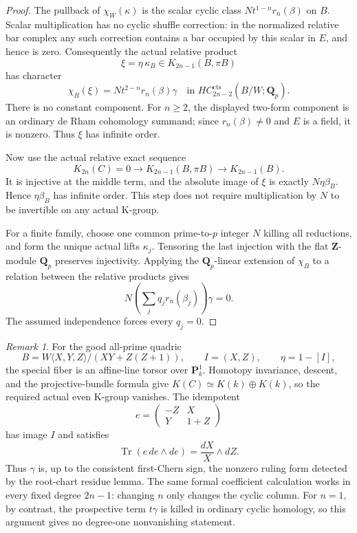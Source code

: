 \documentclass[11pt,a4paper]{article}
\theoremstyle{remark}
\newtheorem{remark}[theorem]{Remark}
\begin{document}
\begin{proof}
The pullback of $\chi_W(\kappa)$ is the scalar cyclic class
$Nt^{1-n}r_n(\beta)$ on $B$. Scalar multiplication has no cyclic
shuffle correction: in the normalized relative bar complex any
such correction contains a bar occupied by this scalar in $E$,
and hence is zero. Consequently the actual relative product
\[
       \xi=\eta\,\kappa_B\in K_{2n-1}(B,\pi B)
\]
has character
\begin{equation}\label{eq:formalhigherTCcupvalue}
       \chi_B(\xi)=N t^{2-n}r_n(\beta)\gamma
       \quad\text{in }HC_{2n-2}^{\mathrm{cts}}(B/W;\mathbf Q_p).
\end{equation}
There is no constant component. For $n\geq2$, the displayed
two-form component is an ordinary de Rham cohomology summand;
since $r_n(\beta)\ne0$ and $E$ is a field, it is nonzero.
Thus $\xi$ has infinite order.

Now use the actual relative exact sequence
\[
 K_{2n}(C)=0\longrightarrow K_{2n-1}(B,\pi B)
                    \longrightarrow K_{2n-1}(B).
\]
It is injective at the middle term, and the absolute image of
$\xi$ is exactly $N\eta\beta_B$. Hence $\eta\beta_B$ has infinite
order. This step does not require multiplication by $N$ to be
invertible on any actual K-group.

For a finite family, choose one common prime-to-$p$ integer $N$
killing all reductions, and form the unique actual lifts
$\kappa_j$. Tensoring the last injection with the flat
$\mathbf Z$-module $\mathbf Q_p$ preserves injectivity.
Applying the $\mathbf Q_p$-linear extension of $\chi_B$ to a
relation between the relative products gives
\[
       N\left(\sum_j q_jr_n(\beta_j)\right)\gamma=0.
\]
The assumed independence forces every $q_j=0$.
\end{proof}

\begin{remark}
For the good all-prime quadric
\[
 B=W\langle X,Y,Z\rangle/(XY+Z(Z+1)),
 \qquad I=(X,Z),\qquad\eta=1-[I],
\]
the special fiber is an affine-line torsor over $\mathbf P^1_k$.
Homotopy invariance, descent, and the projective-bundle formula
give $K(C)\simeq K(k)\oplus K(k)$, so the required actual even
K-group vanishes. The idempotent
\[
 e=\begin{pmatrix}-Z&X\\Y&1+Z\end{pmatrix}
\]
has image $I$ and satisfies
\[
 \operatorname{Tr}(e\,de\wedge de)
                  =\frac{dX}{X}\wedge dZ.
\]
Thus $\gamma$ is, up to the consistent first-Chern sign, the
nonzero ruling form detected by the root-chart residue lemma.
The same formal coefficient calculation works in every fixed
degree $2n-1$: changing $n$ only changes the cyclic column.
For $n=1$, by contrast, the prospective term $t\gamma$ is killed
in ordinary cyclic homology, so this argument gives no
degree-one nonvanishing statement.
\end{remark}
\end{document}
